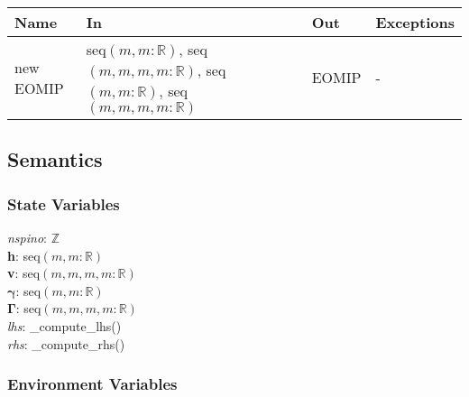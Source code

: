 \documentclass[12pt, titlepage]{article}
\begin{document}
\begin{center}
	\begin{tabular}{p{2.3cm} p{4cm} p{4cm} p{2cm}}
		\hline
		\textbf{Name} & \textbf{In} & \textbf{Out} & \textbf{Exceptions} \\
		\hline
		new EOMIP & seq$(m,m:\mathbb{R})$, seq$(m,m,m,m:\mathbb{R})$, 
		seq$(m,m:\mathbb{R})$, seq$(m,m,m,m:\mathbb{R})$& EOMIP & - \\
		\hline
	\end{tabular}
\end{center}

\subsection{Semantics}

\subsubsection{State Variables}
\textit{nspino}: $\mathbb{Z}$\\
\textbf{h}: seq$(m,m:\mathbb{R})$\\
\textbf{v}: seq$(m,m,m,m:\mathbb{R})$\\
$\boldsymbol{\gamma}$: seq$(m,m:\mathbb{R})$\\
$\boldsymbol{\Gamma}$: seq$(m,m,m,m:\mathbb{R})$\\
\textit{lhs}: \_compute\_lhs()\\
\textit{rhs}: \_compute\_rhs()

\subsubsection{Environment Variables}
\end{document}
